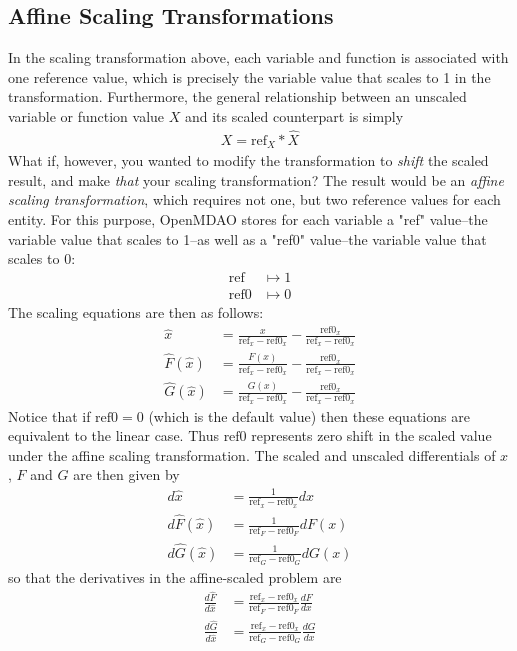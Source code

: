 \documentclass[conf]{new-aiaa}
\begin{document}
	\subsection{Affine Scaling Transformations}
	In the scaling transformation above, each variable and function is associated with one reference value, which is precisely the variable value that scales to 1 in the transformation. Furthermore, the general relationship between an unscaled variable or function value $X$ and its scaled counterpart is simply
	\begin{align}
		X = \text{ref}_X * \hat{X}
	\end{align}
	What if, however, you wanted to modify the transformation to \textit{shift} the scaled result, and make \textit{that} your scaling transformation? The result would be an \textit{affine scaling transformation}, which requires not one, but two reference values for each entity. For this purpose, OpenMDAO stores for each variable a "ref" value--the variable value that scales to 1--as well as a "ref0" value--the variable value that scales to 0:
	\begin{align}
		\text{ref} &\mapsto 1 \\
		\text{ref0} &\mapsto 0
	\end{align}
	The scaling equations are then as follows:
	\begin{align}
	\hat{x} &= \frac{x}{\text{ref}_x - \text{ref0}_x} - \frac{\text{ref0}_x}{\text{ref}_x - \text{ref0}_x} \label{eq:aff_scale_x}\\
	\hat{F}(\hat{x}) &= \frac{F(x)}{\text{ref}_x - \text{ref0}_x} - \frac{\text{ref0}_x}{\text{ref}_x - \text{ref0}_x} \label{eq:aff_scale_F}\\
	\hat{G}(\hat{x}) &= \frac{G(x)}{\text{ref}_x - \text{ref0}_x} - \frac{\text{ref0}_x}{\text{ref}_x - \text{ref0}_x} \label{eq:aff_scale_G}
	\end{align}
	Notice that if $\text{ref0}=0$ (which is the default value) then these equations are equivalent to the linear case. Thus $\text{ref0}$ represents zero shift in the scaled value under the affine scaling transformation.
	The scaled and unscaled differentials of $x$, $F$ and $G$ are then given by
	\begin{align}
		d\hat{x} &= \frac{1}{\text{ref}_x - \text{ref0}_x} dx \\
		d\hat{F}(\hat{x}) &= \frac{1}{\text{ref}_F - \text{ref0}_F} dF(x) \\
		d\hat{G}(\hat{x}) &= \frac{1}{\text{ref}_G - \text{ref0}_G} dG(x)
	\end{align}
	so that the derivatives in the affine-scaled problem are
	\begin{align}
		\frac{d\hat{F}}{d\hat{x}} &= \frac{\text{ref}_x-\text{ref0}_x}{\text{ref}_F-\text{ref0}_F} \frac{dF}{dx} \\
		\frac{d\hat{G}}{d\hat{x}} &= \frac{\text{ref}_x-\text{ref0}_x}{\text{ref}_G-\text{ref0}_G} \frac{dG}{dx}
	\end{align}
	
\end{document}
